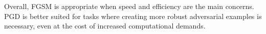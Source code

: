 \documentclass{article}
\begin{document}
Overall, FGSM is appropriate when speed and efficiency are the main concerns. PGD is better suited for tasks where creating more robust adversarial examples is necessary, even at the cost of increased computational demands.





















\newpage

 
\end{document}
